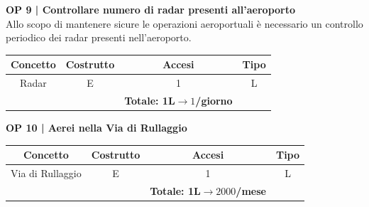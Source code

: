\vspace{.6cm}


\textbf{\small OP 9 | Controllare numero di radar presenti all'aeroporto }\\

\textsf{\small Allo scopo di mantenere sicure le operazioni aeroportuali è necessario un controllo periodico dei radar presenti nell'aeroporto.}\break

\begin{tabular}{ c c c c} 
	\hline
	\rowcolor{airforceblue}
	\textbf{\color{white}Concetto} & \textbf{\color{white}Costrutto} & \textbf{\color{white}Accesi} & \textbf{\color{white}Tipo}\\
	\hline
	\textsf{\small Radar} & \textsf{\small E} & \textsf{\small 1} &  \textsf{\small L}\\
	\hline
	\rowcolor{airforceblue}
	\textsf{\small } & \textsf{\small } & \textbf{\color{white}Totale: 1L$\rightarrow 1$/giorno } \textsf{\small } & \textsf{\small }\\
	\hline
\end{tabular}

\vspace{.6cm}


\textbf{\small OP 10 | Aerei nella Via di Rullaggio}\\

\begin{tabular}{ c c c c} 
	\hline
	\rowcolor{airforceblue}
	\textbf{\color{white}Concetto} & \textbf{\color{white}Costrutto} & \textbf{\color{white}Accesi} & \textbf{\color{white}Tipo}\\
	\hline
	\textsf{\small Via di Rullaggio} & \textsf{\small E} & \textsf{\small 1} &  \textsf{\small L}\\
	\hline
	\rowcolor{airforceblue}
	\textsf{\small } & \textsf{\small } & \textbf{\color{white}Totale: 1L$\rightarrow 2000$/mese } \textsf{\small } & \textsf{\small }\\
	\hline
\end{tabular}

\vspace{.6cm}

\pagebreak


